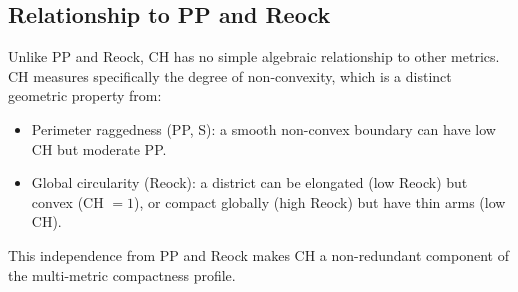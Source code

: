 \subsection{Relationship to PP and Reock}

Unlike PP and Reock, CH has no simple algebraic relationship to other metrics.
CH measures specifically the degree of non-convexity, which is a distinct
geometric property from:
\begin{itemize}
  \item Perimeter raggedness (PP, S): a smooth non-convex boundary can have
    low CH but moderate PP.
  \item Global circularity (Reock): a district can be elongated (low Reock)
    but convex (CH $= 1$), or compact globally (high Reock) but have thin arms
    (low CH).
\end{itemize}
This independence from PP and Reock makes CH a non-redundant component of
the multi-metric compactness profile.
